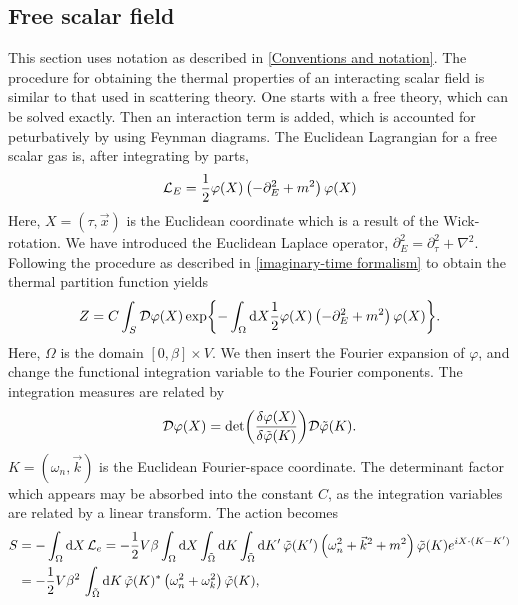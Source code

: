 \subsection*{Free scalar field}

This section uses notation as described in \autoref{Conventions and notation}.
The procedure for obtaining the thermal properties of an interacting scalar field is similar to that used in scattering theory.
One starts with a free theory, which can be solved exactly.
Then an interaction term is added, which is accounted for peturbatively by using Feynman diagrams.
The Euclidean Lagrangian for a free scalar gas is, after integrating by parts,
\begin{equation*}
    \mathcal{L}_E = \frac{1}{2} \varphi(X) \left( -\partial_E^2 + m^2 \right) \varphi(X)
\end{equation*}
Here, $X = (\tau, \vec x)$ is the Euclidean coordinate which is a result of the Wick-rotation.
We have introduced the Euclidean Laplace operator, $\partial_E^2 = \partial_\tau^2 + \nabla^2$.
Following the procedure as described in \autoref{imaginary-time formalism} to obtain the thermal partition function yields
\begin{equation*}
    Z = C \int_S \mathcal{D} \varphi(X) 
    \exp{
        - \int_\Omega \dd X \frac{1}{2} 
        \varphi(X) \left( -\partial_E^2 + m^2 \right) \varphi(X)
    }.
\end{equation*}
Here, $\Omega$ is the domain $[0, \beta] \times V$.
We then insert the Fourier expansion of $\varphi$, and change the functional integration variable to the Fourier components.
The integration measures are related by
\begin{equation*}
    \mathcal{D} \varphi(X) = \det(\frac{\delta \varphi(X)}{\delta \tilde \varphi(K)}) \mathcal{D}\tilde \varphi(K).
\end{equation*}
$K = (\omega_n, \vec k)$ is the Euclidean Fourier-space coordinate.
The determinant factor which appears may be absorbed into the constant $C$, as the integration variables are related by a linear transform.
The action becomes 
\begin{align*}
    S & = - \int_\Omega \dd X\, \mathcal{L}_e 
    = - \frac{1}{2} V \beta \int_\Omega \dd X \int_{\tilde \Omega} \dd K \int_{\tilde \Omega} \dd K' \,
    \tilde \varphi(K') 
    \left(
        \omega_n^2 + \vec k^2 + m^2
    \right)
    \tilde \varphi(K)
    e^{iX\cdot(K - K')} \\
    & = - \frac{1}{2} V \beta^2 \, \int_{\tilde \Omega} \dd K \,
    \tilde \varphi(K)^*
    \left(
        \omega_n^2 + \omega_k^2
    \right)
    \tilde \varphi(K),
\end{align*}
